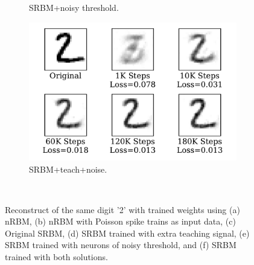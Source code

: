 \begin{figure}
\begin{subfigure}[t]{0.32\textwidth}
		\caption{SRBM+noisy threshold.}
	\end{subfigure}
	\begin{subfigure}[t]{0.32\textwidth}
		\includegraphics[width=\textwidth]{pics_sdlm/53_MNIST_SRBM_all/recon_digit.pdf}
		\caption{SRBM+teach+noise.}
	\end{subfigure}\\
	\caption{Reconstruct of the same digit '2' with trained weights using (a) nRBM, (b) nRBM with Poisson spike trains as input data, (c) Original SRBM, (d) SRBM trained with extra teaching signal, (e) SRBM trained with neurons of noisy threshold, and (f) SRBM trained with both solutions.}
\end{figure}




